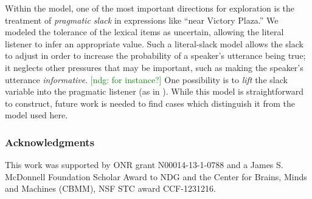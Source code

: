 \documentclass[10pt,letterpaper]{article}
\newcommand{\ndg}[1]{\textcolor{Green}{[ndg: #1]}}
\begin{document}
Within the model, one of the most important directions for exploration is the treatment of \emph{pragmatic slack} in expressions like ``near Victory Plaza.'' We modeled the tolerance of the lexical items as uncertain, allowing the literal listener to infer an appropriate value. Such a literal-slack model allows the slack to adjust in order to increase the probability of a speaker's utterance being true; it neglects other pressures that may be important, such as making the speaker's utterance \emph{informative}. 
\ndg{for instance?}
One possibility is to \emph{lift} the slack variable into the pragmatic listener (as in ). While this model is straightforward to construct, future work is needed to find cases which distinguish it from the model used here.

\subsubsection{Acknowledgments}

This work was supported by ONR grant N00014-13-1-0788 and a James S. McDonnell Foundation Scholar Award to NDG and the Center for Brains, Minds and Machines (CBMM), NSF STC award CCF-1231216. 

\vspace{-8pt}

\setlength{\bibleftmargin}{.125in}
\setlength{\bibindent}{-\bibleftmargin}

\end{document}
